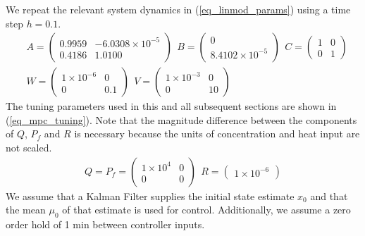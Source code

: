 We repeat the relevant system dynamics in (\ref{eq_linmod_params}) using a time step $h=0.1$. 
\begin{equation}
\begin{aligned}
&A = \begin{pmatrix}
0.9959 & -6.0308\times 10^{-5} \\
0.4186 & 1.0100
\end{pmatrix}
~~B = \begin{pmatrix}
0 \\ 8.4102\times 10^{-5}
\end{pmatrix} ~~
C = \begin{pmatrix}
1 & 0 \\ 0 & 1
\end{pmatrix} \\
&W = \begin{pmatrix}
1\times 10^{-6} & 0 \\ 0 & 0.1
\end{pmatrix} ~~
V = \begin{pmatrix}
1\times 10^{-3} & 0 \\ 0 & 10
\end{pmatrix}
\end{aligned}
\label{eq_linmod_params}
\end{equation}
The tuning parameters used in this and all subsequent sections are shown in (\ref{eq_mpc_tuning}). Note that the magnitude difference between the components of $Q$, $P_f$ and $R$ is necessary because the units of concentration and heat input are not scaled. 
\begin{equation}
\begin{aligned}
Q = P_f = \begin{pmatrix}
1\times 10^{4} & 0 \\ 0 & 0
\end{pmatrix} 
~~R = \begin{pmatrix}
1\times 10^{-6}
\end{pmatrix}
\end{aligned}
\label{eq_mpc_tuning}
\end{equation}
We assume that a Kalman Filter supplies the initial state estimate $x_0$ and that the mean $\mu_0$ of that estimate is used for control. Additionally, we assume a zero order hold of 1 min between controller inputs.

